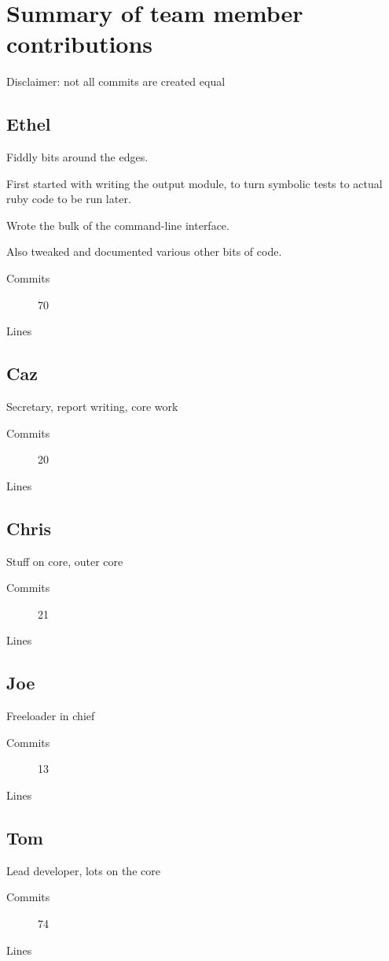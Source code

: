 \section{Summary of team member contributions}
Disclaimer: not all commits are created equal

\subsection{Ethel}
Fiddly bits around the edges.

First started with writing the output module, to turn symbolic tests to actual ruby code to be run later.

Wrote the bulk of the command-line interface.

Also tweaked and documented various other bits of code.
\begin{description}
\item[Commits] 70
\item[Lines]
\end{description}

\subsection{Caz}
Secretary, report writing, core work
\begin{description}
\item[Commits] 20
\item[Lines]
\end{description}

\subsection{Chris}
Stuff on core, outer core
\begin{description}
\item[Commits] 21
\item[Lines]
\end{description}

\subsection{Joe}
Freeloader in chief
\begin{description}
\item[Commits] 13
\item[Lines]
\end{description}

\subsection{Tom}
Lead developer, lots on the core
\begin{description}
\item[Commits] 74
\item[Lines]
\end{description}

